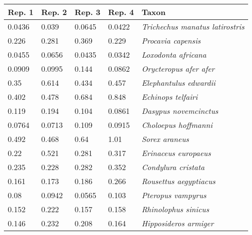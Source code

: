\begin{tabular}{lllll}
\toprule
         Rep. 1 &          Rep. 2 &          Rep. 3 &         Rep. 4 &                                         Taxon \\
\midrule
         0.0436 &           0.039 &          0.0645 &         0.0422 &       \textit{Trichechus manatus latirostris} \\
          0.226 &           0.281 &           0.369 &          0.229 &                    \textit{Procavia capensis} \\
         0.0455 &          0.0656 &          0.0435 &         0.0342 &                   \textit{Loxodonta africana} \\
         0.0909 &          0.0995 &           0.144 &         0.0862 &                \textit{Orycteropus afer afer} \\
           0.35 &           0.614 &           0.434 &          0.457 &                \textit{Elephantulus edwardii} \\
          0.402 &           0.478 &           0.684 &          0.848 &                    \textit{Echinops telfairi} \\
          0.119 &           0.194 &           0.104 &         0.0861 &                 \textit{Dasypus novemcinctus} \\
         0.0764 &          0.0713 &           0.109 &         0.0915 &                  \textit{Choloepus hoffmanni} \\
          0.492 &           0.468 &            0.64 &           1.01 &                        \textit{Sorex araneus} \\
           0.22 &           0.521 &           0.281 &          0.317 &                  \textit{Erinaceus europaeus} \\
          0.235 &           0.228 &           0.282 &          0.352 &                   \textit{Condylura cristata} \\
          0.161 &           0.173 &           0.186 &          0.266 &                \textit{Rousettus aegyptiacus} \\
           0.08 &          0.0942 &          0.0565 &          0.103 &                    \textit{Pteropus vampyrus} \\
          0.152 &           0.222 &           0.157 &          0.158 &                  \textit{Rhinolophus sinicus} \\
          0.146 &           0.232 &           0.208 &          0.164 &                 \textit{Hipposideros armiger} \\

\end{tabular}
